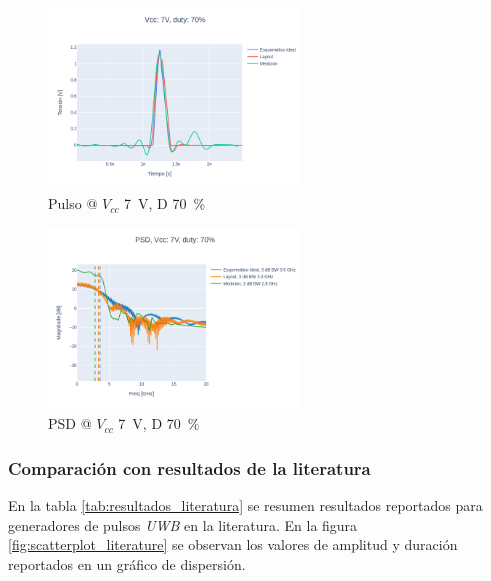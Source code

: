 \begin{figure}
  \centering
    \includegraphics[width=0.6\textwidth]{images/plots/Vcc_7V_duty_70_time_domain.png}
    \caption{Pulso @ $V_{cc}$ \qty{7}{\volt}, D \qty{70}{\percent} }
    \label{fig:plots_7v_70}
\end{figure}

\begin{figure}
  \centering
    \includegraphics[width=0.6\textwidth]{images/plots/Vcc_7V_duty_70_psd.png}
    \caption{PSD @ $V_{cc}$ \qty{7}{\volt}, D \qty{70}{\percent} }
    \label{fig:psd_7v_70}
\end{figure}

\subsubsection{Comparación con resultados de la literatura}

En la tabla \ref{tab:resultados_literatura} se resumen resultados reportados para generadores de
pulsos \textit{UWB} en la literatura. En la figura \ref{fig:scatterplot_literature} se observan
los valores de amplitud y duración reportados en un gráfico de dispersión.

